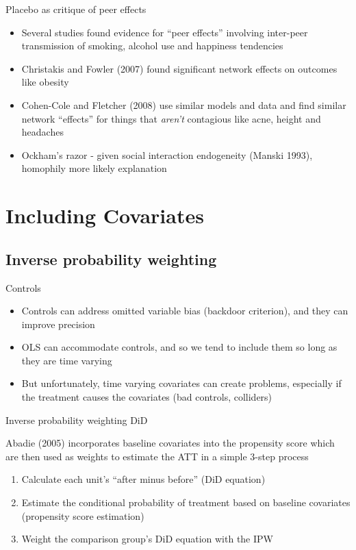 \documentclass{beamer}
\begin{document}
\begin{frame}{Placebo as critique of peer effects}

\begin{itemize}
	\item Several studies found evidence for ``peer effects'' involving inter-peer transmission of smoking, alcohol use and happiness tendencies
	\item Christakis and Fowler (2007) found significant network effects on outcomes like obesity
	\item Cohen-Cole and Fletcher (2008) use similar models and data and find similar network ``effects'' for things that \emph{aren't} contagious like acne, height and headaches
	\item Ockham's razor - given social interaction endogeneity (Manski 1993), homophily more likely explanation
\end{itemize}

\end{frame}



\section{Including Covariates}

\subsection{Inverse probability weighting}

\begin{frame}{Controls}

\begin{itemize}
\item Controls can address omitted variable bias (backdoor criterion), and they can improve precision
\item OLS can accommodate controls, and so we tend to include them so long as they are time varying 
\item But unfortunately, time varying covariates can create problems, especially if the treatment causes the covariates (bad controls, colliders)
\end{itemize}

\end{frame}






\begin{frame}{Inverse probability weighting DiD}

 Abadie (2005) incorporates baseline covariates into the propensity score which are then used as weights to estimate the ATT in a simple 3-step process
	\begin{enumerate}
	\item Calculate each unit's ``after minus before'' (DiD equation)
	\item Estimate the conditional probability of treatment based on baseline covariates (propensity score estimation)
	\item Weight the comparison group's DiD equation with the IPW
	\end{enumerate}

\end{frame}
\end{document}
